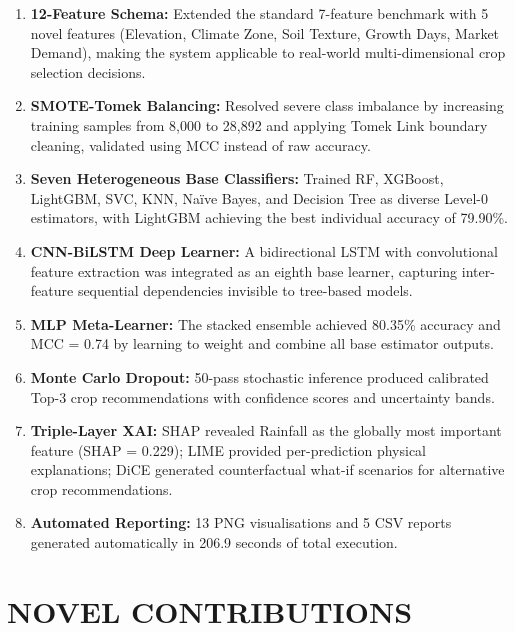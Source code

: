 \documentclass[12pt,a4paper,oneside]{report}
\begin{document}
\begin{enumerate}[leftmargin=*, label=\arabic*.]
  \item \textbf{12-Feature Schema:} Extended the standard 7-feature benchmark with 5 novel features (Elevation, Climate Zone, Soil Texture, Growth Days, Market Demand), making the system applicable to real-world multi-dimensional crop selection decisions.

  \item \textbf{SMOTE-Tomek Balancing:} Resolved severe class imbalance by increasing training samples from 8,000 to 28,892 and applying Tomek Link boundary cleaning, validated using MCC instead of raw accuracy.

  \item \textbf{Seven Heterogeneous Base Classifiers:} Trained RF, XGBoost, LightGBM, SVC, KNN, Na\"{i}ve Bayes, and Decision Tree as diverse Level-0 estimators, with LightGBM achieving the best individual accuracy of 79.90\%.

  \item \textbf{CNN-BiLSTM Deep Learner:} A bidirectional LSTM with convolutional feature extraction was integrated as an eighth base learner, capturing inter-feature sequential dependencies invisible to tree-based models.

  \item \textbf{MLP Meta-Learner:} The stacked ensemble achieved 80.35\% accuracy and MCC = 0.74 by learning to weight and combine all base estimator outputs.

  \item \textbf{Monte Carlo Dropout:} 50-pass stochastic inference produced calibrated Top-3 crop recommendations with confidence scores and uncertainty bands.

  \item \textbf{Triple-Layer XAI:} SHAP revealed Rainfall as the globally most important feature (SHAP = 0.229); LIME provided per-prediction physical explanations; DiCE generated counterfactual what-if scenarios for alternative crop recommendations.

  \item \textbf{Automated Reporting:} 13 PNG visualisations and 5 CSV reports generated automatically in 206.9 seconds of total execution.
\end{enumerate}

\section{NOVEL CONTRIBUTIONS}
\end{document}
